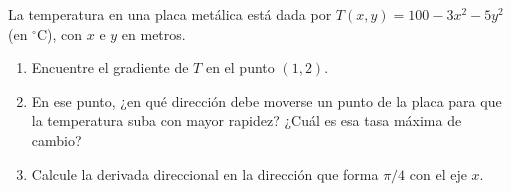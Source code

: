 La temperatura en una placa metálica está dada por $T(x, y) = 100 - 3x^2 - 5y^2$ (en $^\circ$C), con $x$ e $y$ en metros.
\begin{enumerate}
    \item Encuentre el gradiente de $T$ en el punto $(1, 2)$.
    \item En ese punto, ¿en qué dirección debe moverse un punto de la placa para que la temperatura suba con mayor rapidez? ¿Cuál es esa tasa máxima de cambio?
    \item Calcule la derivada direccional en la dirección que forma $\pi/4$ con el eje $x$.
\end{enumerate}

